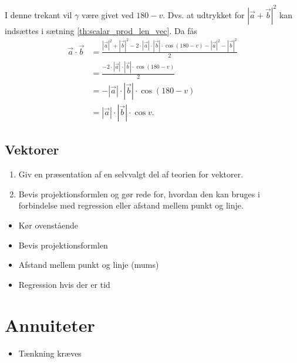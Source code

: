 \documentclass{article}
\begin{document}
I denne trekant vil $\gamma$ være givet ved $180 - v$. Dvs. at udtrykket for
$|\vec{a} + \vec{b}|^2$ kan indsættes i sætning \ref{th:scalar_prod_len_vec}.
Da fås
\begin{align*}
	\vec{a} \cdot \vec{b} &= \frac{|\vec{a}|^2 + |\vec{b}|^2 - 2 \cdot |\vec{a}| \cdot |\vec{b}| \cdot \cos{(180 - v)} - |\vec{a}|^2 - |\vec{b}|^2}{2}\\
						  &= \frac{- 2 \cdot |\vec{a}| \cdot |\vec{b}| \cdot \cos{(180 - v)}}{2}\\
						  &= -|\vec{a}| \cdot |\vec{b}| \cdot \cos{(180 - v)}\\
						  &= |\vec{a}| \cdot |\vec{b}| \cdot \cos{v}.
\end{align*}

\begin{tcolorbox}
	\section{Vektorer}
	\tcblower
	\begin{enumerate}
		\item Giv en præsentation af en selvvalgt del af teorien for vektorer.
		\item Bevis projektionsformlen og gør rede for, hvordan den kan bruges
			i forbindelse med regression eller afstand mellem punkt og linje.
	\end{enumerate}
\end{tcolorbox}

\begin{itemize}
	\item Kør ovenstående
	\item Bevis projektionsformlen
	\item Afstand mellem punkt og linje (mums)
	\item Regression hvis der er tid
\end{itemize}

\section{Annuiteter}
\begin{itemize}
	\item Tænkning kræves
\end{itemize}
\end{document}
